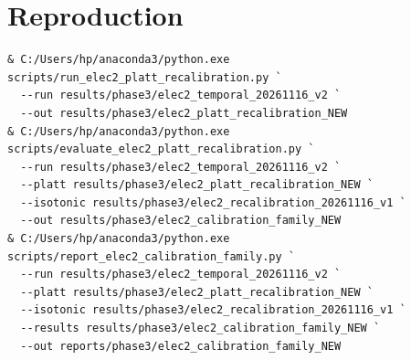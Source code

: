 \documentclass[10pt,a4paper]{article}
\begin{document}
\section{Reproduction}
\begin{verbatim}
& C:/Users/hp/anaconda3/python.exe scripts/run_elec2_platt_recalibration.py `
  --run results/phase3/elec2_temporal_20261116_v2 `
  --out results/phase3/elec2_platt_recalibration_NEW
& C:/Users/hp/anaconda3/python.exe scripts/evaluate_elec2_platt_recalibration.py `
  --run results/phase3/elec2_temporal_20261116_v2 `
  --platt results/phase3/elec2_platt_recalibration_NEW `
  --isotonic results/phase3/elec2_recalibration_20261116_v1 `
  --out results/phase3/elec2_calibration_family_NEW
& C:/Users/hp/anaconda3/python.exe scripts/report_elec2_calibration_family.py `
  --run results/phase3/elec2_temporal_20261116_v2 `
  --platt results/phase3/elec2_platt_recalibration_NEW `
  --isotonic results/phase3/elec2_recalibration_20261116_v1 `
  --results results/phase3/elec2_calibration_family_NEW `
  --out reports/phase3/elec2_calibration_family_NEW
\end{verbatim}
\end{document}
